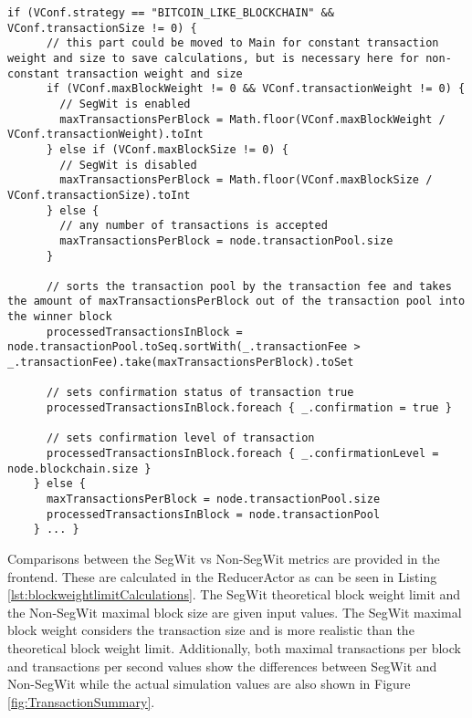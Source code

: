 \begin{minipage}{\linewidth}
\begin{lstlisting}[style=myScalastyle,label=lst:blockweightlimit,caption={VBlock with focus on block weight limit}]
    if (VConf.strategy == "BITCOIN_LIKE_BLOCKCHAIN" && VConf.transactionSize != 0) {
      // this part could be moved to Main for constant transaction weight and size to save calculations, but is necessary here for non-constant transaction weight and size
      if (VConf.maxBlockWeight != 0 && VConf.transactionWeight != 0) {
        // SegWit is enabled
        maxTransactionsPerBlock = Math.floor(VConf.maxBlockWeight / VConf.transactionWeight).toInt
      } else if (VConf.maxBlockSize != 0) {
        // SegWit is disabled
        maxTransactionsPerBlock = Math.floor(VConf.maxBlockSize / VConf.transactionSize).toInt
      } else {
        // any number of transactions is accepted
        maxTransactionsPerBlock = node.transactionPool.size
      }

      // sorts the transaction pool by the transaction fee and takes the amount of maxTransactionsPerBlock out of the transaction pool into the winner block
      processedTransactionsInBlock = node.transactionPool.toSeq.sortWith(_.transactionFee > _.transactionFee).take(maxTransactionsPerBlock).toSet

      // sets confirmation status of transaction true
      processedTransactionsInBlock.foreach { _.confirmation = true }

      // sets confirmation level of transaction
      processedTransactionsInBlock.foreach { _.confirmationLevel = node.blockchain.size }
    } else {
      maxTransactionsPerBlock = node.transactionPool.size
      processedTransactionsInBlock = node.transactionPool
    } ... }    
\end{lstlisting}
\end{minipage}

Comparisons between the SegWit vs Non-SegWit metrics are provided in the frontend. These are calculated in the ReducerActor as can be seen in Listing \ref{lst:blockweightlimitCalculations}. The SegWit theoretical block weight limit and the Non-SegWit maximal block size are given input values. The SegWit maximal block weight considers the transaction size and is more realistic than the theoretical block weight limit. Additionally, both maximal transactions per block and transactions per second values show the differences between SegWit and Non-SegWit while the actual simulation values are also shown in Figure \ref{fig:TransactionSummary}.

